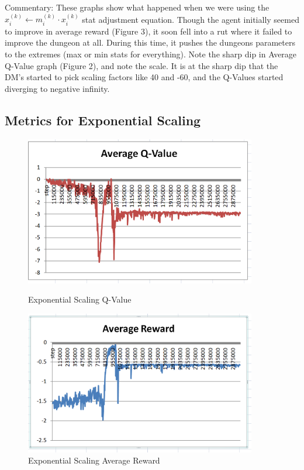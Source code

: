\documentclass{article}
\begin{document}
Commentary: These graphs show what happened when we were using the $x^{(k)}_{i} \leftarrow m^{(k)}_i \cdot x^{(k)}_{i}$ stat adjustment equation. Though the agent initially seemed to improve in average reward (Figure 3), it soon fell into a rut where it failed to improve the dungeon at all. During this time, it pushes the dungeons parameters to the extremes (max or min stats for everything). Note the sharp dip in Average Q-Value graph (Figure 2), and note the scale. It is at the sharp dip that the DM's started to pick scaling factors like 40 and -60, and the Q-Values started diverging to negative infinity.

\newpage
\subsection{Metrics for Exponential Scaling}
\begin{figure}[h]
	\begin{minipage}{0.5 \textwidth}
		\centering
		\includegraphics[width=0.9\textwidth]{AverageQ.png}
		\caption{Exponential Scaling Q-Value}
	\end{minipage}
	\begin{minipage}{0.5 \textwidth}
		\centering
		\includegraphics[width=0.9\textwidth]{AverageReward.png}
		\caption{Exponential Scaling Average Reward}
	\end{minipage}
\end{figure}
\end{document}
